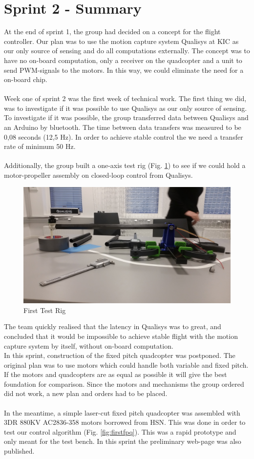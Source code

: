\section{Sprint 2 - Summary}

At the end of sprint 1, the group had decided on a concept for the flight controller. Our plan was to use the motion capture system Qualisys at KIC as our only source of sensing and do all computations externally. The concept was to have no on-board computation, only a receiver on the quadcopter and a unit to send PWM-signals to the motors. In this way, we could eliminate the need for a on-board chip. 
\\\\
Week one of sprint 2 was the first week of technical work. The first thing we did, was to investigate if it was possible to use Qualisys as our only source of sensing. To investigate if it was possible, the group transferred data between Qualisys and an Arduino by bluetooth. The time between data transfers was measured to be 0,08 seconds (12,5 Hz). In order to achieve stable control the we need a transfer rate of minimum 50 Hz.
\\\\
Additionally, the group built a one-axis test rig (Fig. \ref{fig:firsttestrig}) to see if we could hold a motor-propeller assembly on closed-loop control from Qualisys.

\begin{figure}[h]
        \centering
        \includegraphics[width = 0.5
        \textwidth]{VAPIQ-PICTURES//TestRig(arm)1}
         \caption{First Test Rig}
         \label{fig:firsttestrig}
    \end{figure}   
\noindent
The team quickly realised that the latency in Qualisys was to great, and concluded that it would be impossible to achieve stable flight with the motion capture system by itself, without on-board computation.
\\
In this sprint, construction of the fixed pitch quadcopter was postponed. The original plan was to use motors which could handle both variable and fixed pitch. If the motors and quadcopters are as equal as possible it will give the best foundation for comparison. Since the motors and mechanisms the group ordered did not work, a new plan and orders had to be placed. 
\\\\
In the meantime, a simple laser-cut fixed pitch quadcopter was assembled with 3DR 880KV AC2836-358 motors borrowed from HSN. This was done in order to test our control algorithm (Fig. \ref{fig:firstfpq}). This was a rapid prototype and only meant for the test bench. In this sprint the preliminary web-page was also published.

